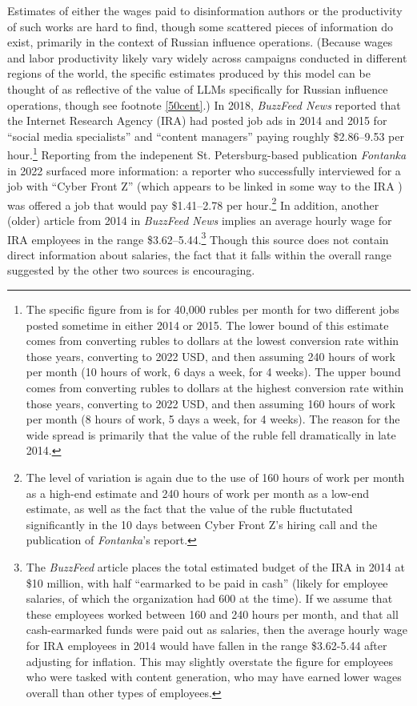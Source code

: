 \documentclass{article}
\begin{document}
Estimates of either the wages paid to disinformation authors or the productivity of such works are hard to find, though some scattered pieces of information do exist, primarily in the context of Russian influence operations. (Because wages and labor productivity likely vary widely across campaigns conducted in different regions of the world, the specific estimates produced by this model can be thought of as reflective of the value of LLMs specifically for Russian influence operations, though see footnote \ref{50cent}.) In 2018, \textit{BuzzFeed News} reported that the Internet Research Agency (IRA) had posted job ads in 2014 and 2015 for ``social media specialists'' and ``content managers'' paying roughly \$2.86–9.53 per hour.\footnote{The specific figure from \cite{buzzfeed} is for 40,000 rubles per month for two different jobs posted sometime in either 2014 or 2015. The lower bound of this estimate comes from converting rubles to dollars at the lowest conversion rate within those years, converting to 2022 USD, and then assuming 240 hours of work per month (10 hours of work, 6 days a week, for 4 weeks). The upper bound comes from converting rubles to dollars at the highest conversion rate within those years, converting to 2022 USD, and then assuming 160 hours of work per month (8 hours of work, 5 days a week, for 4 weeks). The reason for the wide spread is primarily that the value of the ruble fell dramatically in late 2014.} \cite{buzzfeed} Reporting from the indepenent St. Petersburg-based publication \textit{Fontanka} in 2022 surfaced more information: a reporter who successfully interviewed for a job with ``Cyber Front Z'' (which appears to be linked in some way to the IRA \cite{vice}) was offered a job that would pay \$1.41–2.78 per hour.\footnote{The level of variation is again due to the use of 160 hours of work per month as a high-end estimate and 240 hours of work per month as a low-end estimate, as well as the fact that the value of the ruble fluctutated significantly in the 10 days between Cyber Front Z's hiring call and the publication of \textit{Fontanka}'s report.} \cite{fontanka} In addition, another (older) article from 2014 in \textit{BuzzFeed News} implies an average hourly wage for IRA employees in the range \$3.62–5.44.\footnote{The \textit{BuzzFeed} article places the total estimated budget of the IRA in 2014 at \$10 million, with half ``earmarked to be paid in cash'' (likely for employee salaries, of which the organization had 600 at the time). If we assume that these employees worked between 160 and 240 hours per month, and that all cash-earmarked funds were paid out as salaries, then the average hourly wage for IRA employees in 2014 would have fallen in the range \$3.62-5.44 after adjusting for inflation. This may slightly overstate the figure for employees who were tasked with content generation, who may have earned lower wages overall than other types of employees.} \cite{seddon} Though this source does not contain direct information about salaries, the fact that it falls within the overall range suggested by the other two sources is encouraging. 
\end{document}
